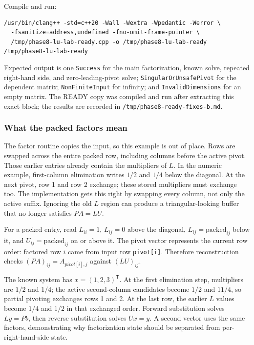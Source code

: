Compile and run:

\begin{verbatim}
/usr/bin/clang++ -std=c++20 -Wall -Wextra -Wpedantic -Werror \
  -fsanitize=address,undefined -fno-omit-frame-pointer \
  /tmp/phase8-lu-lab-ready.cpp -o /tmp/phase8-lu-lab-ready
/tmp/phase8-lu-lab-ready
\end{verbatim}

Expected output is one \texttt{Success} for the main factorization, known solve, repeated right-hand side, and zero-leading-pivot solve; \texttt{SingularOrUnsafePivot} for the dependent matrix; \texttt{NonFiniteInput} for infinity; and \texttt{InvalidDimensions} for an empty matrix. The READY copy was compiled and run after extracting this exact block; the results are recorded in \texttt{/tmp/phase8-ready-fixes-b.md}.

\subsubsection{What the packed factors mean}\label{01-foundations-i-ch019-what-the-packed-factors-mean}

The factor routine copies the input, so this example is out of place. Rows are swapped across the entire packed row, including columns before the active pivot. Those earlier entries already contain the multipliers of \(L\). In the numeric example, first-column elimination writes \(1/2\) and \(1/4\) below the diagonal. At the next pivot, row 1 and row 2 exchange; these stored multipliers must exchange too. The implementation gets this right by swapping every column, not only the active suffix. Ignoring the old \(L\) region can produce a triangular-looking buffer that no longer satisfies \(PA=LU\).

For a packed entry, read \(L_{ii}=1\), \(L_{ij}=0\) above the diagonal, \(L_{ij}=\text{packed}_{ij}\) below it, and \(U_{ij}=\text{packed}_{ij}\) on or above it. The pivot vector represents the current row order: factored row \(i\) came from input row \texttt{pivot{[}i{]}}. Therefore reconstruction checks \((PA)_{ij}=A_{pivot[i],j}\) against \((LU)_{ij}\).

The known system has \(x=(1,2,3)^\mathsf T\). At the first elimination step, multipliers are \(1/2\) and \(1/4\); the active second-column candidates become \(1/2\) and \(11/4\), so partial pivoting exchanges rows 1 and 2. At the last row, the earlier \(L\) values become \(1/4\) and \(1/2\) in that exchanged order. Forward substitution solves \(Ly=Pb\), then reverse substitution solves \(Ux=y\). A second vector uses the same factors, demonstrating why factorization state should be separated from per-right-hand-side state.

